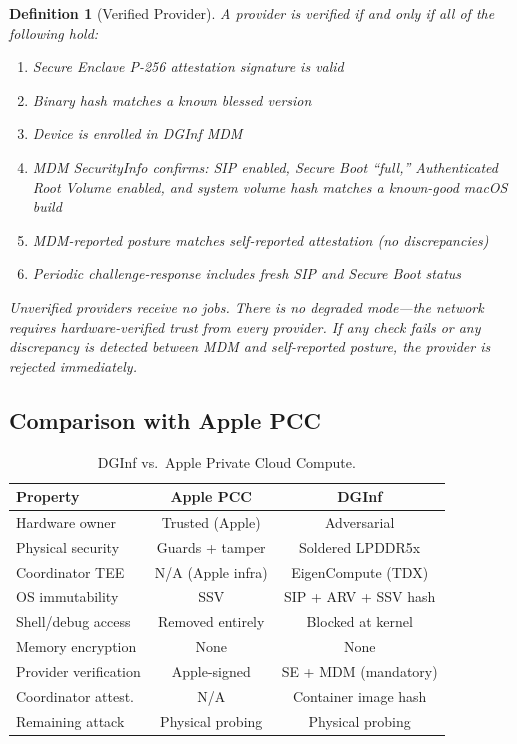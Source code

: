 \documentclass[10pt,twocolumn,letterpaper]{article}
\newtheorem{definition}{Definition}
\begin{document}
\begin{definition}[Verified Provider]
A provider is \emph{verified} if and only if all of the following hold:
\begin{enumerate}[leftmargin=*,itemsep=1pt]
    \item Secure Enclave P-256 attestation signature is valid
    \item Binary hash matches a known blessed version
    \item Device is enrolled in DGInf MDM
    \item MDM SecurityInfo confirms: SIP enabled, Secure Boot ``full,'' Authenticated Root Volume enabled, and system volume hash matches a known-good macOS build
    \item MDM-reported posture matches self-reported attestation (no discrepancies)
    \item Periodic challenge-response includes fresh SIP and Secure Boot status
\end{enumerate}
Unverified providers receive no jobs. There is no degraded mode---the network requires hardware-verified trust from every provider. If any check fails or any discrepancy is detected between MDM and self-reported posture, the provider is rejected immediately.
\end{definition}

\subsection{Comparison with Apple PCC}

\begin{table}[h]
\centering
\caption{DGInf vs.\ Apple Private Cloud Compute.}
\label{tab:pcc}
\vspace{4pt}
\small
\begin{tabular}{@{}lcc@{}}
\toprule
\textbf{Property} & \textbf{Apple PCC} & \textbf{DGInf} \\
\midrule
Hardware owner & Trusted (Apple) & Adversarial \\
Physical security & Guards + tamper & Soldered LPDDR5x \\
Coordinator TEE & N/A (Apple infra) & EigenCompute (TDX) \\
OS immutability & SSV & SIP + ARV + SSV hash \\
Shell/debug access & Removed entirely & Blocked at kernel \\
Memory encryption & None & None \\
Provider verification & Apple-signed & SE + MDM (mandatory) \\
Coordinator attest. & N/A & Container image hash \\
Remaining attack & Physical probing & Physical probing \\
\bottomrule
\end{tabular}
\end{table}
\end{document}
